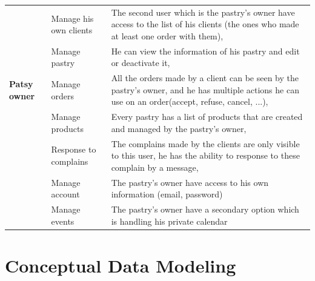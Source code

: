 \documentclass[12pt,a4paper]{report}
\begin{document}
\begin{table}[H]
\begin{center}
\begin{tabular}{|l|p{5cm}|p{8cm}| }
				\hline
				\hline
				\multirow{5}{*}{\textbf{Patsy owner} }
				& Manage his own clients & The second user which is the pastry's owner have access to the list of his clients (the ones who made at least one order with them),                
				\\
				\cline{2-3}
				& Manage pastry          & He can view the information of his pastry and edit or deactivate it,                                                                                
				\\
				\cline{2-3}
				& Manage orders          & All the orders made by a client can be seen by the pastry's owner, and he has multiple actions he can use on an order(accept, refuse, cancel, ...), 
				\\
				\cline{2-3}
				& Manage products        & Every pastry has a list of products that are created and managed by the pastry's owner,                                                             
				\\
				\cline{2-3}
				& Response to complains  & The complains made by the clients are only visible to this user, he has the ability to response to these complain by a message,                     
				\\
				\cline{2-3}
				& Manage account         & The pastry's owner have access to his own information (email, password)                                                                             \\
				\cline{2-3}
				& Manage events          & The pastry's owner have a secondary option which is handling his private calendar                                                                   \\
				\hline
			\end{tabular}
		\end{center}
		
		
	\end{table}
	\section{Conceptual Data Modeling}
\end{document}
